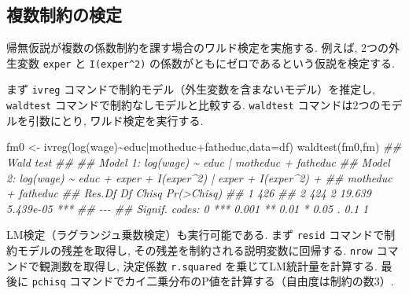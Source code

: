 \documentclass[
  letterpaper,
  xelatex,
  ja=standard, xelatex]{bxjsbook}
\newenvironment{Shaded}{\begin{snugshade}}{\end{snugshade}}
\newcommand{\AttributeTok}[1]{\textcolor[rgb]{0.40,0.45,0.13}{#1}}
\newcommand{\DocumentationTok}[1]{\textcolor[rgb]{0.37,0.37,0.37}{\textit{#1}}}
\newcommand{\FunctionTok}[1]{\textcolor[rgb]{0.28,0.35,0.67}{#1}}
\newcommand{\NormalTok}[1]{\textcolor[rgb]{0.00,0.23,0.31}{#1}}
\newcommand{\OtherTok}[1]{\textcolor[rgb]{0.00,0.23,0.31}{#1}}
\newcommand{\SpecialCharTok}[1]{\textcolor[rgb]{0.37,0.37,0.37}{#1}}
\begin{document}
\subsection{複数制約の検定}\label{ux8907ux6570ux5236ux7d04ux306eux691cux5b9a}

帰無仮説が複数の係数制約を課す場合のワルド検定を実施する. 例えば,
2つの外生変数 \texttt{exper} と \texttt{I(exper\^{}2)}
の係数がともにゼロであるという仮説を検定する.

まず \texttt{ivreg}
コマンドで制約モデル（外生変数を含まないモデル）を推定し,
\texttt{waldtest} コマンドで制約なしモデルと比較する. \texttt{waldtest}
コマンドは2つのモデルを引数にとり, ワルド検定を実行する.

\begin{Shaded}
\begin{Highlighting}[]
\NormalTok{fm0 }\OtherTok{\textless{}{-}} \FunctionTok{ivreg}\NormalTok{(}\FunctionTok{log}\NormalTok{(wage)}\SpecialCharTok{\textasciitilde{}}\NormalTok{educ}\SpecialCharTok{|}\NormalTok{motheduc}\SpecialCharTok{+}\NormalTok{fatheduc,}\AttributeTok{data=}\NormalTok{df)}
\FunctionTok{waldtest}\NormalTok{(fm0,fm)}
\DocumentationTok{\#\# Wald test}
\DocumentationTok{\#\# }
\DocumentationTok{\#\# Model 1: log(wage) \textasciitilde{} educ | motheduc + fatheduc}
\DocumentationTok{\#\# Model 2: log(wage) \textasciitilde{} educ + exper + I(exper\^{}2) | exper + I(exper\^{}2) + }
\DocumentationTok{\#\#     motheduc + fatheduc}
\DocumentationTok{\#\#   Res.Df Df  Chisq Pr(\textgreater{}Chisq)    }
\DocumentationTok{\#\# 1    426                         }
\DocumentationTok{\#\# 2    424  2 19.639  5.439e{-}05 ***}
\DocumentationTok{\#\# {-}{-}{-}}
\DocumentationTok{\#\# Signif. codes:  0 \textquotesingle{}***\textquotesingle{} 0.001 \textquotesingle{}**\textquotesingle{} 0.01 \textquotesingle{}*\textquotesingle{} 0.05 \textquotesingle{}.\textquotesingle{} 0.1 \textquotesingle{} \textquotesingle{} 1}
\end{Highlighting}
\end{Shaded}

LM検定（ラグランジュ乗数検定）も実行可能である. まず \texttt{resid}
コマンドで制約モデルの残差を取得し,
その残差を制約される説明変数に回帰する. \texttt{nrow}
コマンドで観測数を取得し, 決定係数 \texttt{r.squared}
を乗じてLM統計量を計算する. 最後に \texttt{pchisq}
コマンドでカイ二乗分布のP値を計算する（自由度は制約の数3）.
\end{document}
